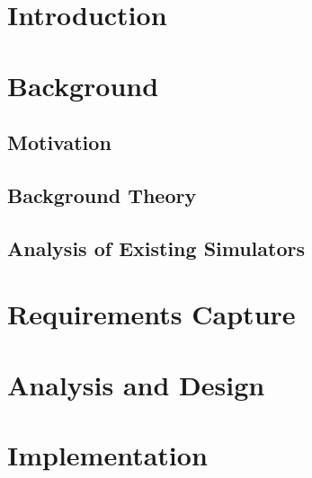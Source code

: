 \documentclass[11pt,a4paper,twoside,openright]{report}
\begin{document}

\pagebreak

\pagebreak

\cleardoublepage

\cleardoublepage


\tableofcontents
\cleardoublepage
\listoffigures
\cleardoublepage
\listoftables


\newpage

\chapter{Introduction}



\chapter{Background}

\section{Motivation}


\section{Background Theory}


\section{Analysis of Existing Simulators} \label{analysisOfSimulators} %


\chapter{Requirements Capture} \label{ReqCap}



\chapter{Analysis and Design} \label{design}



\chapter{Implementation} \label{implementation}

\end{document}
